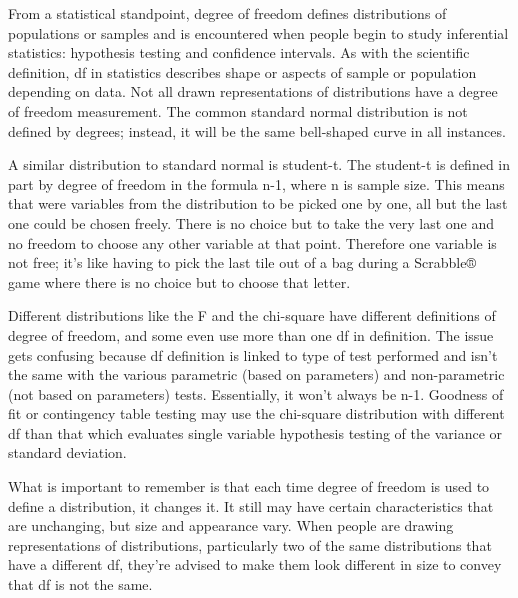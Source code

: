  

From a statistical standpoint, degree of freedom defines distributions of populations or samples and is encountered when people begin to study inferential statistics: hypothesis testing and confidence intervals. As with the scientific definition, df in statistics describes shape or aspects of sample or population depending on data. Not all drawn representations of distributions have a degree of freedom measurement. The common standard normal distribution is not defined by degrees; instead, it will be the same bell-shaped curve in all instances.

 

A similar distribution to standard normal is student-t. The student-t is defined in part by degree of freedom in the formula n-1, where n is sample size. This means that were variables from the distribution to be picked one by one, all but the last one could be chosen freely. There is no choice but to take the very last one and no freedom to choose any other variable at that point. Therefore one variable is not free; it’s like having to pick the last tile out of a bag during a Scrabble® game where there is no choice but to choose that letter.

 

Different distributions like the F and the chi-square have different definitions of degree of freedom, and some even use more than one df in definition. The issue gets confusing because df definition is linked to type of test performed and isn’t the same with the various parametric (based on parameters) and non-parametric (not based on parameters) tests. Essentially, it won’t always be n-1. Goodness of fit or contingency table testing may use the chi-square distribution with different df than that which evaluates single variable hypothesis testing of the variance or standard deviation.

 

What is important to remember is that each time degree of freedom is used to define a distribution, it changes it. It still may have certain characteristics that are unchanging, but size and appearance vary. When people are drawing representations of distributions, particularly two of the same distributions that have a different df, they’re advised to make them look different in size to convey that df is not the same.

 






